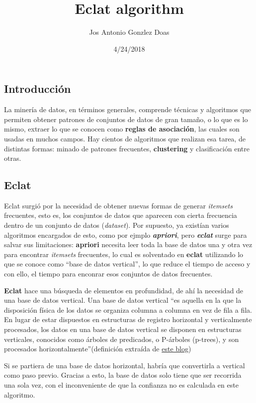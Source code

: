 \documentclass[]{article}
\title{Eclat algorithm}
\author{Jos Antonio Gonzlez Doas}
\date{4/24/2018}
\begin{document}
\maketitle

\subsection{Introducción}\label{introduccion}

La minería de datos, en términos generales, comprende técnicas y
algoritmos que permiten obtener patrones de conjuntos de datos de gran
tamaño, o lo que es lo mismo, extraer lo que se conocen como
\textbf{reglas de asociación}, las cuales son usadas en muchos campos.
Hay cientos de algoritmos que realizan esa tarea, de distintas formas:
minado de patrones frecuentes, \textbf{clustering} y clasificación entre
otras.

\subsection{Eclat}\label{eclat}

Eclat surgió por la necesidad de obtener nuevas formas de generar
\emph{itemsets} frecuentes, esto es, los conjuntos de datos que aparecen
con cierta frecuencia dentro de un conjunto de datos (\emph{dataset}).
Por supuesto, ya existían varios algoritmos encargados de esto, como por
ejmplo \emph{\textbf{apriori}}, pero \emph{\textbf{eclat}} surge para
salvar sus limitaciones: \textbf{apriori} necesita leer toda la base de
datos una y otra vez para encontrar \emph{itemsets} frecuentes, lo cual
es solventado en \textbf{eclat} utilizando lo que se conoce como ``base
de datos vertical'', lo que reduce el tiempo de acceso y con ello, el
tiempo para enconrar esos conjuntos de datos frecuentes.

\textbf{Eclat} hace una búsqueda de elementos en profundidad, de ahí la
necesidad de una base de datos vertical. Una base de datos vertical ``es
aquella en la que la disposición física de los datos se organiza columna
a columna en vez de fila a fila. En lugar de estar dispuestos en
estructuras de registro horizontal y verticalmente procesados, los datos
en una base de datos vertical se disponen en estructuras verticales,
conocidos como árboles de predicados, o P-árboles (p-trees), y son
procesados horizontalmente''(definición extraída de
\href{https://basededatosunounivia.wordpress.com/2015/03/14/que-es-una-base-de-datos-vertical/}{este
blog})

Si se partiera de una base de datos horizontal, habría que convertirla a
vertical como paso previo. Gracias a esto, la base de datos solo tiene
que ser recorrida una sola vez, con el inconveniente de que la confianza
no es calculada en este algoritmo.
\end{document}
